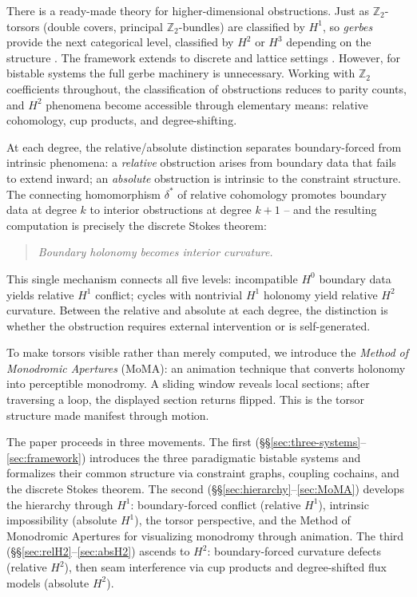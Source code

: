 \documentclass[11pt]{amsart}  %
\theoremstyle{plain}
\theoremstyle{definition}
\theoremstyle{remark}
\newcommand{\style}[1]{{\em #1}} %
\newcommand{\connecting}{\delta^*} %
\newcommand{\Z}{\mathbb{Z}} %
\begin{document}
There is a ready-made theory for higher-dimensional obstructions. Just as $\Z_2$-torsors (double covers, principal $\Z_2$-bundles) are classified by $H^1$, so \emph{gerbes} provide the next categorical level, classified by $H^2$ or $H^3$ depending on the structure \cite{Brylinski1993LoopSpaces,Moerdijk2002StacksGerbes}. The framework extends to discrete and lattice settings \cite{BullivantEtAl2017HigherLattices}. However, for bistable systems the full gerbe machinery is unnecessary. Working with $\Z_2$ coefficients throughout, the classification of obstructions reduces to parity counts, and $H^2$ phenomena become accessible through elementary means: relative cohomology, cup products, and degree-shifting.

At each degree, the relative/absolute distinction separates boundary-forced from intrinsic phenomena: a \style{relative} obstruction arises from boundary data that fails to extend inward; an \style{absolute} obstruction is intrinsic to the constraint structure. The connecting homomorphism $\connecting$ of relative cohomology promotes boundary data at degree $k$ to interior obstructions at degree $k+1$ -- and the resulting computation is precisely the discrete Stokes theorem:
\begin{quote}
\emph{Boundary holonomy becomes interior curvature.}
\end{quote}
This single mechanism connects all five levels: incompatible $H^0$ boundary data yields relative $H^1$ conflict; cycles with nontrivial $H^1$ holonomy yield relative $H^2$ curvature. Between the relative and absolute at each degree, the distinction is whether the obstruction requires external intervention or is self-generated.

To make torsors visible rather than merely computed, we introduce the \emph{Method of Monodromic Apertures} (MoMA): an animation technique that converts holonomy into perceptible monodromy. A sliding window reveals local sections; after traversing a loop, the displayed section returns flipped. This is the torsor structure made manifest through motion.

The paper proceeds in three movements. The first (\S\S\ref{sec:three-systems}--\ref{sec:framework}) introduces the three paradigmatic bistable systems and formalizes their common structure via constraint graphs, coupling cochains, and the discrete Stokes theorem. The second (\S\S\ref{sec:hierarchy}--\ref{sec:MoMA}) develops the hierarchy through $H^1$: boundary-forced conflict (relative $H^1$), intrinsic impossibility (absolute $H^1$), the torsor perspective, and the Method of Monodromic Apertures for visualizing monodromy through animation. The third (\S\S\ref{sec:relH2}--\ref{sec:absH2}) ascends to $H^2$: boundary-forced curvature defects (relative $H^2$), then seam interference via cup products and degree-shifted flux models (absolute $H^2$).
\end{document}
